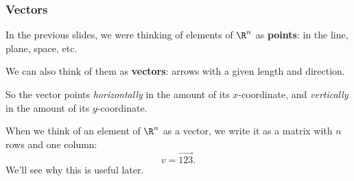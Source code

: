 
\begin{frame}
\frametitle{Vectors}
In the previous slides, we were thinking of elements of $\R^n$ as
\textbf{points}: in the line, plane, space, etc.

\pause\medskip
We can also think of them as \textbf{vectors}: arrows with a given length and
direction. 
\begin{center}
\end{center}
\pause
So the vector points \emph{horizontally} in the amount of its $x$-coordinate,
and \emph{vertically} in the amount of its $y$-coordinate.

\pause\medskip
When we think of an element of $\R^n$ as a vector, we write it as a matrix with
$n$ rows and one column:
\[ v = \vec{ 1 2 3}. \]
We'll see why this is useful later.


\end{frame}



